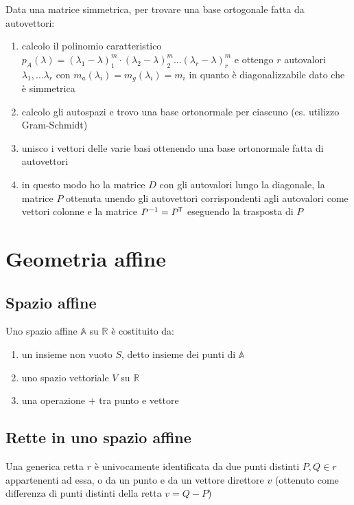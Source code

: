 \documentclass[a4paper]{article}
\newcommand\tran{^{\mkern-1.5mu\mathsf{T}}} %
\begin{document}
Data una matrice simmetrica, per trovare una base ortogonale fatta da autovettori:
\begin{enumerate}[topsep=3pt, itemsep=0pt]
	\item calcolo il polinomio caratteristico \(p_A(\lambda) = (\lambda_1 - \lambda)^m_1 \cdot (\lambda_2 - \lambda)^m_2 \dots (\lambda_r - \lambda)^m_r\)
	e ottengo \(r\) autovalori \(\lambda_1, \dots \lambda_r\) con \(m_a(\lambda_i) = m_g(\lambda_i) = m_i\) in quanto è diagonalizzabile
	dato che è simmetrica
	\item calcolo gli autospazi e trovo una base ortonormale per ciascuno (es. utilizzo Gram-Schmidt)
	\item unisco i vettori delle varie basi ottenendo una base ortonormale fatta di autovettori
	\item[] in questo modo ho la matrice \(D\) con gli autovalori lungo la diagonale, la matrice \(P\) ottenuta unendo gli autovettori
	corrispondenti agli autovalori come vettori colonne e la matrice \(P^{-1} = P \tran\) eseguendo la trasposta di \(P\)
\end{enumerate}

\newpage

\section{Geometria affine}
\subsection{Spazio affine}
Uno spazio affine \(\mathbb{A}\) su \(\mathbb{R}\) è costituito da:
\begin{enumerate}[topsep=3pt, itemsep=0pt]
	\item un insieme non vuoto \(S\), detto insieme dei punti di \(\mathbb{A}\)
	\item uno spazio vettoriale \(V\) su \(\mathbb{R}\)
	\item una operazione \(+\) tra punto e vettore
\end{enumerate}

\subsection{Rette in uno spazio affine}
Una generica retta \(r\) è univocamente identificata da due punti distinti \(P, Q \in r\) appartenenti ad essa, o da un punto
e da un vettore direttore \(v\) (ottenuto come differenza di punti distinti della retta \(v = Q - P\))
\end{document}
